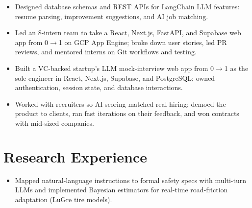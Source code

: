 \documentclass[11pt, letterpaper]{article}
\begin{document}
\vspace{1pt}
\begin{itemize}
  \item Designed database schemas and REST APIs for LangChain LLM features: resume parsing, improvement suggestions, and AI job matching.
  \item Led an 8-intern team to take a React, Next.js, FastAPI, and Supabase web app from 0$\to$1 on GCP App Engine; broke down user stories, led PR reviews, and mentored interns on Git workflows and testing.
\end{itemize}

\vspace{1pt}
\begin{itemize}
  \item Built a VC-backed startup's LLM mock-interview web app from 0$\to$1 as the sole engineer in React, Next.js, Supabase, and PostgreSQL; owned authentication, session state, and database interactions.
  \item Worked with recruiters so AI scoring matched real hiring; demoed the product to clients, ran fast iterations on their feedback, and won contracts with mid-sized companies.
\end{itemize}

\section{Research Experience}
\begin{itemize}
  \item Mapped natural-language instructions to formal safety specs with multi-turn LLMs and implemented Bayesian estimators for real-time road-friction adaptation (LuGre tire models).
\end{itemize}
\end{document}

